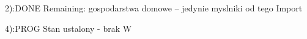 
2):DONE
Remaining:
gospodarstwa domowe -- jedynie myslniki od tego
Import

4):PROG
Stan ustalony -  brak W